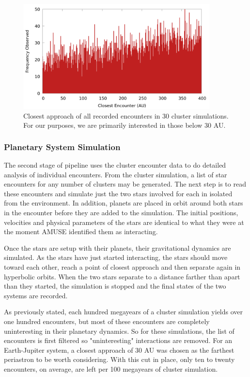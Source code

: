 \documentclass[12pt]{article}
\begin{document}
    \begin{figure}[H]
        \centering
        \caption{Closest approach of all recorded encounters in 30 cluster simulations.
            For our purposes, we are primarily interested in those below 30 AU.
        }
        \label{fig:encounter_distance}
        \includegraphics[width=4.0in]{encounter_distance_frequency}
    \end{figure}

    \subsubsection{Planetary System Simulation}

    The second stage of pipeline uses the cluster encounter data to do
    detailed analysis of individual encounters.
    From the cluster simulation, a list of star encounters for any number of 
    clusters may be generated. The next step is to read these encounters and
    simulate just the two stars involved for each in isolated from the 
    environment. In addition, planets are placed in orbit around both stars in the
    encounter before they are added to the simulation. The initial positions,
    velocities and physical parameters of the stars are identical to what they
    were at the moment AMUSE identified them as interacting. 

    Once the stars are setup with their planets, their gravitational dynamics
    are simulated. As the stars have just started interacting, the stars should
    move toward each other, reach a point of closest approach and then separate again
    in hyperbolic orbits. When the two stars separate to a distance farther than
    apart than they started, the simulation is stopped and the final states of the two
    systems are recorded. 

    As previously stated, each hundred megayears of a cluster simulation yields over
    one hundred encounters, but most of these encounters are completely uninteresting
    in their planetary dynamics. So for these simulations, the list of encounters is 
    first filtered so "uninteresting" interactions are removed. For an Earth-Jupiter
    system, a closest approach of 30 AU was chosen as the farthest periastron to be
    worth considering. With this cut in place, only ten to twenty encounters, on
    average, are left per 100 megayears of cluster simulation.
\end{document}
